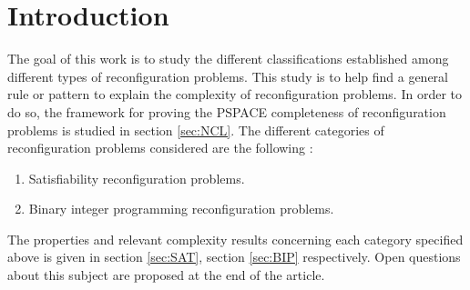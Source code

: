 \section{Introduction}
The goal of this work is to study the different classifications established among different types of reconfiguration problems.
This study is to help find a general rule or pattern to explain the complexity of reconfiguration problems. In order to do so, the framework for proving the PSPACE completeness of reconfiguration problems is studied in section \ref{sec:NCL}. 
The different categories of reconfiguration problems considered are the following :  
\begin{enumerate}
    \item Satisfiability reconfiguration problems.
    \item Binary integer programming reconfiguration problems.
\end{enumerate}
The properties and relevant complexity results concerning each category specified above is given in section \ref{sec:SAT}, section \ref{sec:BIP} respectively. Open questions about this subject are proposed at the end of the article.

